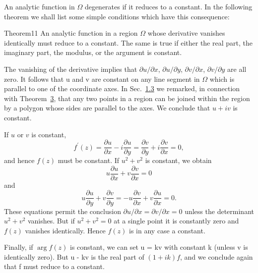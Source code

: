 An analytic function in $\Omega$ degenerates if it reduces to a constant. In
the following theorem we shall list some simple conditions which have this consequence:

\begin{originalstatement}{Theorem}{11}\label{thm:3.11}
An analytic function in a region $\Omega$ whose derivative vanishes identically must reduce to a constant. The same is true if either the real part, the imaginary part, the modulus, or the argument is constant.
\end{originalstatement}
The vanishing of the derivative implies that $\partial u/\partial x$, $\partial u/\partial y$, $\partial v/\partial x$, $\partial v/\partial y$ are all zero. It follows that u and v are constant on any line segment in $\Omega$ which is parallel to one of the coordinate axes. In Sec.~\hyperref[sec:3.1.3]{1.3} we remarked, in connection with Theorem~\hyperref[thm:3.3]{3}, that any two points in a region can be joined within the region by a polygon whose sides are parallel to the axes. We conclude that $u + iv$ is constant.

If $u$ or $v$ is constant,
\begin{equation*}
f ^ {\prime} (z) = \frac {\partial u}{\partial x} - i \frac {\partial u}{\partial y} = \frac {\partial v}{\partial y} + i \frac {\partial v}{\partial x} = 0,
\end{equation*}
and hence $f(z)$ must be constant. If $u^2 + v^2$ is constant, we obtain
\begin{equation*}
u \frac {\partial u}{\partial x} + v \frac {\partial v}{\partial x} = 0
\end{equation*}
and
\begin{equation*}
u \frac {\partial u}{\partial y} + v \frac {\partial v}{\partial y} = - u \frac {\partial v}{\partial x} + v \frac {\partial u}{\partial x} = 0.
\end{equation*}
These equations permit the conclusion $\partial u/\partial x = \partial v/\partial x = 0$ unless the determinant $u^{2} + v^{2}$ vanishes. But if $u^{2} + v^{2} = 0$ at a single point it is constantly zero and $f(z)$ vanishes identically. Hence $f(z)$ is in any case a constant.

Finally, if $\arg f(z)$ is constant, we can set u = kv with constant k (unless v is identically zero). But u - kv is the real part of $(1 + ik)f$, and we conclude again that f must reduce to a constant.

